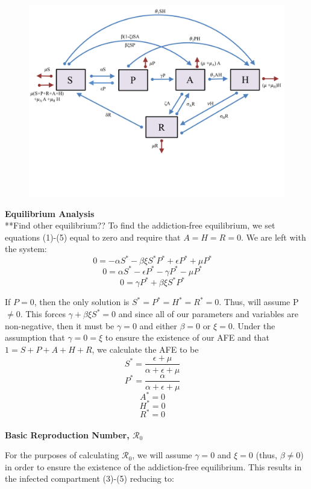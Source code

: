 \documentclass[12pt]{article}
\begin{document}
\begin{figure}
\includegraphics[scale=0.6]{heroin_schematic.pdf}
\end{figure}
\textbf{Equilibrium Analysis} \\
**Find other equilibrium?? 
To find the addiction-free equilibrium, we set equations (1)-(5) equal to zero and require that $A=H=R=0$. We are left with the system: \\
\[0=-\alpha S^* -\beta \xi S^* P^* + \epsilon P^* +\mu P^* \quad\]
\[0=\alpha S^* - \epsilon P^* -\gamma P^* - \mu P^* \quad\]
\[0=\gamma P^* + \beta \xi S^* P^*   \quad\]



If $P=0$, then the only solution is $S^*=P^*=H^*=R^*=0$. Thus, will assume P $\neq 0. $ This forces $\gamma + \beta \xi S^* =0$ and since all of our parameters and variables are non-negative, then it must be $\gamma=0$ and either $\beta=0$ or $\xi=0$. Under the assumption that $\gamma=0=\xi$ to ensure the existence of our AFE and that $1=S+P+A+H+R$, we calculate the AFE to be \\

\[S^*=\frac{\epsilon + \mu}{\alpha + \epsilon +\mu}\quad\]
\[P^*=\frac{\alpha}{\alpha + \epsilon +\mu}\quad\]
\[A^*=0\quad\]
\[H^*=0\quad\]
\[R^*=0\quad\] \\

\textbf{Basic Reproduction Number, \textbf{$\mathscr{R}_0$}}

For the purposes of calculating $\mathscr{R}_0$, we will assume $\gamma =0$ and $\xi =0$ (thus, $\beta \neq 0$) in order to ensure the existence of the addiction-free equilibrium. This results in the infected compartment (3)-(5) reducing to:
\end{document}
